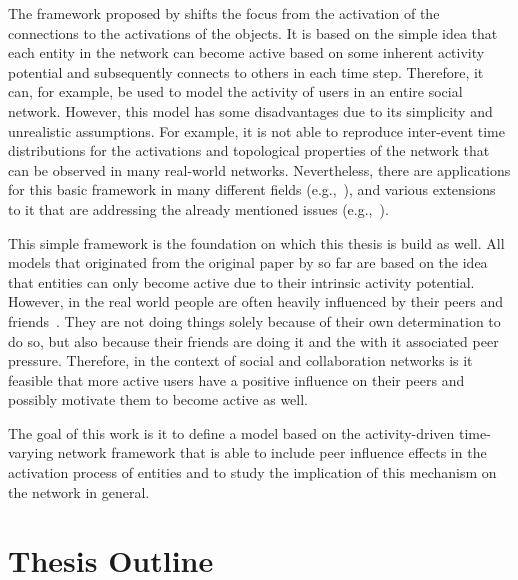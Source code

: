 The framework proposed by \citet{Perra2012a} shifts the focus from the activation of the connections to the activations of the objects.
It is based on the simple idea that each entity in the network can become active based on some inherent activity potential and subsequently connects to others in each time step.
Therefore, it can, for example, be used to model the activity of users in an entire social network.
However, this model has some disadvantages due to its simplicity and unrealistic assumptions.
For example, it is not able to reproduce inter-event time distributions for the activations and topological properties of the network that can be observed in many real-world networks.
Nevertheless, there are applications for this basic framework in many different fields (e.g.,~\cite{Rizzo2014, Rizzo2016}), and various extensions to it that are addressing the already mentioned issues (e.g.,~\cite{Laurent2015, Moinet2015, Moinet2016}).

This simple framework is the foundation on which this thesis is build as well.
All models that originated from the original paper by \citet{Perra2012a} so far are based on the idea that entities can only become active due to their intrinsic activity potential.
However, in the real world people are often heavily influenced by their peers and friends~\cite{Walk2016}.
They are not doing things solely because of their own determination to do so, but also because their friends are doing it and the with it associated peer pressure.
Therefore, in the context of social and collaboration networks is it feasible that more active users have a positive influence on their peers and possibly motivate them to become active as well.

The goal of this work is it to define a model based on the activity-driven time-varying network framework that is able to include peer influence effects in the activation process of entities and to study the implication of this mechanism on the network in general.




\section{Thesis Outline}
\label{sec:outline}

